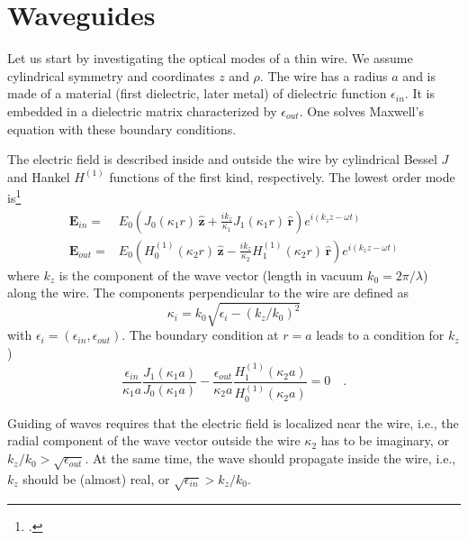 \section{Waveguides}


Let us start by investigating the optical modes of a thin wire. We assume cylindrical symmetry and coordinates $z$ and $\rho$. The wire has a radius $a$ and is made of a material (first dielectric, later metal) of dielectric function $\epsilon_{in}$. It is embedded in a dielectric matrix characterized by $\epsilon_{out}$. One solves Maxwell's equation with these boundary conditions.

The electric field is described inside and outside the wire by cylindrical Bessel $J$ and Hankel $H^{(1)}$ functions of the first kind, respectively. The lowest order mode is\footcite{Takahara97}
\begin{align}
  \mathbf{E}_{in} = & E_0 \left( J_0 (\kappa_1 r)\,  \mathbf{\hat{z}} + \frac{i k_z}{\kappa_1} J_1 (\kappa_1 r)  \, \mathbf{\hat{r}} \right) e^{i (k_z z - \omega t)} \label{eq:rods_mode_Ein}\\
  \mathbf{E}_{out} =& E_0 \left( H_0^{(1)} (\kappa_2 r) \,  \mathbf{\hat{z}} - \frac{i k_z}{\kappa_2} H_1^{(1)} (\kappa_2 r)  \, \mathbf{\hat{r}} \right) e^{i (k_z z - \omega t)} \label{eq:rods_mode_Eout}
\end{align}
where $k_z$ is the component of the wave vector (length in vacuum $k_0 = 2 \pi / \lambda$) along the wire. The components  perpendicular to the wire are defined as
\begin{equation}
  \kappa_i = k_0 \sqrt{\epsilon_i - (k_z / k_0)^2}
\end{equation}
with $\epsilon_i = (\epsilon_{in}, \epsilon_{out})$.
The boundary condition at $r=a$ leads to a condition for $k_z$ )
\begin{equation}
  \frac{\epsilon_{in}}{\kappa_1 a} \frac{J_1(\kappa_1 a)}{J_0(\kappa_1 a)}
 -  \frac{\epsilon_{out}}{\kappa_2 a} \frac{H_1^{(1)}(\kappa_2 a)}{H_0^{(1)}(\kappa_2 a)}
 = 0 \quad . \label{eq:rods_eigenmode_condition}
\end{equation}

Guiding of waves requires that the electric field is localized near the wire, i.e., the radial component of the wave vector outside the wire $\kappa_2$ has to be imaginary, or $k_z / k_0 > \sqrt{\epsilon_{out}}$. At the same time, the wave should propagate inside the wire, i.e., $k_z$ should be (almost) real, or $\sqrt{\epsilon_{in}} > k_z / k_0$. 


